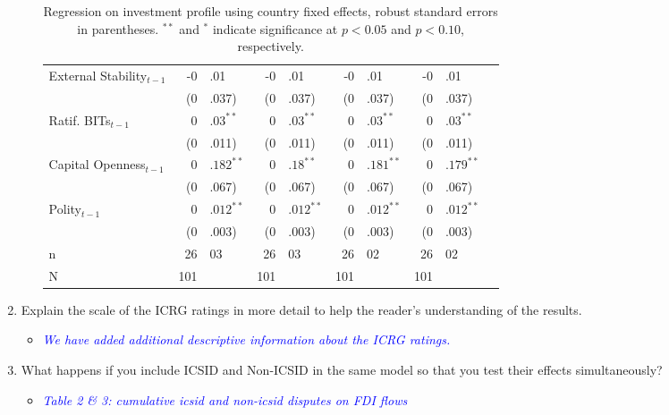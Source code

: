 \begin{enumerate}
\begin{itemize}
\begin{table}[ht]
\begin{tabular}{lr@{}lr@{}lr@{}lr@{}lr@{}}
			  External Stability$_{t-1}$ & -0&.01 & -0&.01 & -0&.01 & -0&.01 \\ 
			   & (0&.037) & (0&.037) & (0&.037) & (0&.037) \\ 
			  Ratif. BITs$_{t-1}$ & $0$&$.03^{\ast\ast}$ & $0$&$.03^{\ast\ast}$ & $0$&$.03^{\ast\ast}$ & $0$&$.03^{\ast\ast}$ \\ 
			   & (0&.011) & (0&.011) & (0&.011) & (0&.011) \\ 
			  Capital Openness$_{t-1}$ & $0$&$.182^{\ast\ast}$ & $0$&$.18^{\ast\ast}$ & $0$&$.181^{\ast\ast}$ & $0$&$.179^{\ast\ast}$ \\ 
			   & (0&.067) & (0&.067) & (0&.067) & (0&.067) \\ 
			  Polity$_{t-1}$ & $0$&$.012^{\ast\ast}$ & $0$&$.012^{\ast\ast}$ & $0$&$.012^{\ast\ast}$ & $0$&$.012^{\ast\ast}$ \\ 
			   & (0&.003) & (0&.003) & (0&.003) & (0&.003) \\ 
			   \hline
			n & 26&03 & 26&03 & 26&02 & 26&02 \\ 
			  N & 101 && 101 && 101 && 101 \\ 
			   \hline
			\hline
			\end{tabular}
			\endgroup
			\caption{Regression on investment profile using country fixed effects, robust standard errors in parentheses. $^{**}$ and $^{*}$ indicate significance at $p< 0.05 $ and $p< 0.10 $, respectively.} 
			\end{table}
			\FloatBarrier		

	\end{itemize}
	\item Explain the scale of the ICRG ratings in more detail to help the reader’s understanding of the results.	
	\begin{itemize}
		\item \textcolor{blue}{ \emph{ We have added additional descriptive information about the ICRG ratings. }}
	\end{itemize}
	
	\clearpage
	\item What happens if you include ICSID and Non-ICSID in the same model so that you test their effects simultaneously?		
	\begin{itemize}
		\item \textcolor{blue}{ \emph{ Table 2 \& 3: cumulative icsid and non-icsid disputes on FDI flows}}


\end{itemize}
\end{enumerate}
